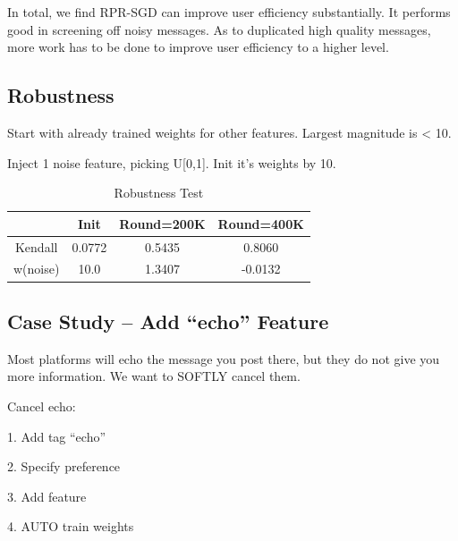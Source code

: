 \documentclass{sig-alternate}
\begin{document}
In total, we find RPR-SGD can improve user efficiency substantially. 
It performs good in screening off noisy messages. 
As to duplicated high quality messages, more work has to be done 
to improve user efficiency to a higher level. 

\subsection{Robustness}
\label{sec:Robustness}

Start with already trained weights for
other features. Largest magnitude is < 10.

Inject 1 noise feature, picking U[0,1]. Init
it's weights by 10.

\begin{table}[htb]
	\centering
	\caption{Robustness Test}
	\begin{tabular}{c|c|c|c}
		\hline 
		& Init & Round=200K & Round=400K \\
		\hline 
		Kendall & 0.0772 & 0.5435 & 0.8060 \\
		 w(noise) & 10.0 & 1.3407 & -0.0132 \\
		\hline
	\end{tabular}
\end{table}

\subsection{Case Study -- Add ``echo'' Feature}
\label{sec:Case Study -- Add ``echo'' Feature}

Most platforms will echo the
message you post there, but they
do not give you more information.
We want to SOFTLY cancel them.

Cancel echo:

1. Add tag ``echo''

2. Specify preference

3. Add feature

4. AUTO train weights
\end{document}
